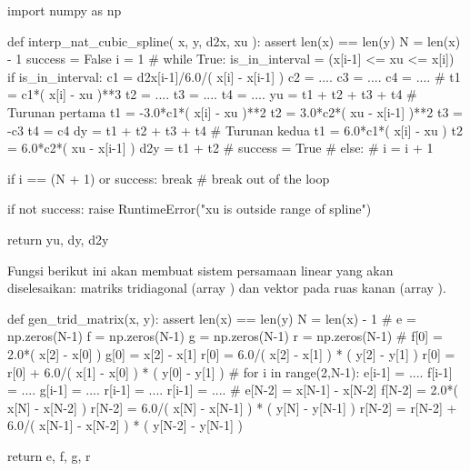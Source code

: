 \begin{pythoncode}
import numpy as np

def interp_nat_cubic_spline( x, y, d2x, xu ):    
    assert len(x) == len(y)
    N = len(x) - 1
    success = False
    i = 1
    #
    while True:
        is_in_interval = (x[i-1] <= xu <= x[i])    
        if is_in_interval:
            c1 = d2x[i-1]/6.0/( x[i] - x[i-1] )
            c2 = ....
            c3 = ....
            c4 = ....
            #
            t1 = c1*( x[i] - xu )**3
            t2 = ....
            t3 = ....
            t4 = ....
            yu = t1 + t2 + t3 + t4
            # Turunan pertama
            t1 = -3.0*c1*( x[i] - xu )**2
            t2 = 3.0*c2*( xu - x[i-1] )**2
            t3 = -c3
            t4 = c4
            dy = t1 + t2 + t3 + t4
            # Turunan kedua
            t1 = 6.0*c1*( x[i] - xu )
            t2 = 6.0*c2*( xu - x[i-1] )
            d2y = t1 + t2
            #
            success = True
            #
        else:
            #
            i = i + 1
        
        if i == (N + 1) or success:
            break # break out of the loop
    
    if not success:
        raise RuntimeError("xu is outside range of spline")
        
    return yu, dy, d2y
\end{pythoncode}

Fungsi berikut ini akan membuat sistem persamaan linear yang akan diselesaikan: matriks tridiagonal
(array )
dan vektor pada ruas kanan (array ).
\begin{pythoncode}
def gen_trid_matrix(x, y):
    assert len(x) == len(y)
    N = len(x) - 1
    #
    e = np.zeros(N-1)
    f = np.zeros(N-1)
    g = np.zeros(N-1)
    r = np.zeros(N-1)
    #
    f[0] = 2.0*( x[2] - x[0] )
    g[0] = x[2] - x[1]
    r[0] = 6.0/( x[2] - x[1] ) * ( y[2] - y[1] )
    r[0] = r[0] + 6.0/( x[1] - x[0] ) * ( y[0] - y[1] )
    #
    for i in range(2,N-1):
        e[i-1] = ....
        f[i-1] = ....
        g[i-1] = ....
        r[i-1] = ....
        r[i-1] = ....
    #    
    e[N-2] = x[N-1] - x[N-2]
    f[N-2] = 2.0*( x[N] - x[N-2] )
    r[N-2] = 6.0/( x[N] - x[N-1] ) * ( y[N] - y[N-1] )
    r[N-2] = r[N-2] + 6.0/( x[N-1] - x[N-2] ) * ( y[N-2] - y[N-1] )
    
    return e, f, g, r    
\end{pythoncode}


